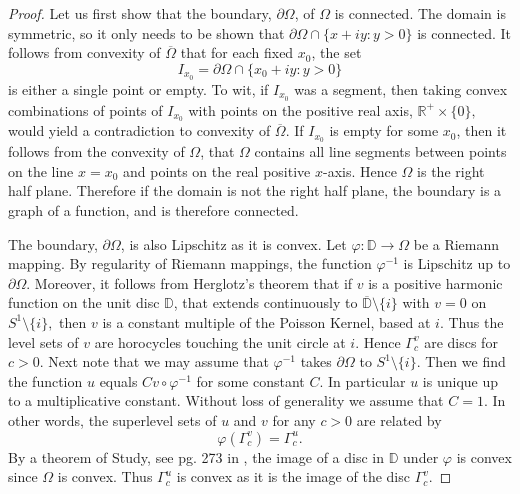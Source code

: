 \documentclass[11pt]{amsart}
\newcommand{\D}{{\mathbb{D}}}
\theoremstyle{definition}
\theoremstyle{remark}
\begin{document}
\begin{proof}%
%
Let us first show that the boundary, $\partial\Omega$, of $\Omega$ is connected.  The domain is symmetric, so it only needs to be shown that
$\partial \Omega \cap \{x+iy : y > 0\}$ is connected.  It follows from convexity of $\overline{\Omega}$ that for
each fixed $x_0$, the set $$I_{x_0} = \partial \Omega \cap \{ x_0+iy : y > 0\}$$ is either a single point or empty.
To wit, if $I_{x_0}$ was a segment, then taking convex combinations of points of $I_{x_0}$ with points on the positive real axis, $\mathbb{R}^{+}\times\{0\},$ would yield a contradiction to convexity of $\overline{\Omega}$.
If $I_{x_0}$ is empty for some $x_0$, then it follows from the convexity of $\Omega$, that $\Omega$ contains all line segments between points on the line $x=x_0$ and points on the real positive $x$-axis. Hence $\Omega$ is the right half plane.
Therefore if the domain is not the right half plane, the boundary is a graph of a function, and is therefore
connected.

The boundary, $\partial\Omega$, is also Lipschitz as it is convex.
Let $\varphi \colon \D \to \Omega$ be a Riemann mapping.
By regularity of Riemann mappings, the function $\varphi^{-1}$ is Lipschitz up to $\partial \Omega$.
Moreover, it follows from Herglotz's theorem that if $v$ is a positive harmonic function on the unit disc $\mathbb{D}$,
that extends continuously to $\overline{\mathbb{D}}\setminus\{ i \}$ with $v =0$ on $S^1\setminus\{ i \},$ then $v$ is a constant multiple of the Poisson Kernel, based at $i$. Thus the level sets of $v$ are horocycles touching the unit circle at $i$. Hence $\Gamma_c^v$ are discs for $c>0$.
Next note that we may assume that $\varphi^{-1}$ takes $\partial \Omega$ to $S^1 \setminus \{ i \}$. Then we find the
function $u$ equals $C v \circ \varphi^{-1}$ for some constant $C$.  In particular $u$ is unique up to a multiplicative
constant.
Without loss of generality we assume that $C=1$.  In other words, the superlevel sets
of $u$ and $v$ for any $c>0$ are related by
\begin{equation*}
\varphi\left(\Gamma_c^v\right) = \Gamma_c^u.
\end{equation*}
By a theorem of Study, see pg. 273 in \cite{RR},
the image of a disc in $\D$ under $\varphi$ is convex since $\Omega$ is convex.
Thus $\Gamma_c^u$ is convex as it is the image of the disc $\Gamma_c^v$.


\end{proof}
\end{document}
